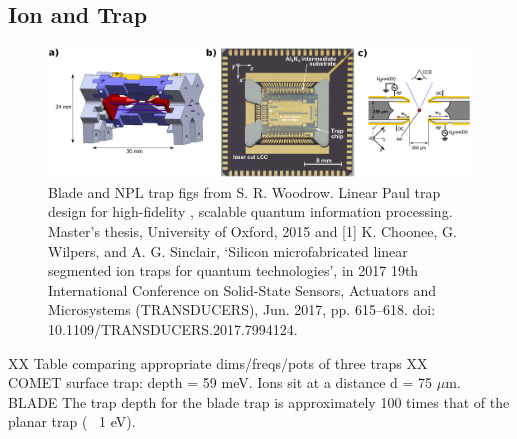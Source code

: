 \documentclass[12pt]{iopart}
\begin{document}
\subsection{Ion and Trap}

\begin{figure}
  \begin{center}
   \noindent\includegraphics[width=\linewidth]{figures/trap_comp.png}
  \end{center}
  \caption{Blade and NPL trap
  figs from S. R. Woodrow. Linear Paul trap design for high-fidelity ,
  scalable quantum information processing. Master’s thesis, University
  of Oxford, 2015 and [1] K. Choonee, G. Wilpers, and A. G. Sinclair,
  ‘Silicon microfabricated linear segmented ion traps for quantum
  technologies’, in 2017 19th International Conference on Solid-State
  Sensors, Actuators and Microsystems (TRANSDUCERS), Jun. 2017,
  pp. 615–618. doi: 10.1109/TRANSDUCERS.2017.7994124.}

  \label{fig:trap}
\end{figure}

XX Table comparing appropriate dims/freqs/pots of three traps XX\\
COMET surface trap: depth = 59 meV. Ions sit at a distance d = 75 $\mu$m.\\
BLADE The trap depth for the blade trap is approximately 100 times that of the planar trap (~ 1 eV).\\
\end{document}
